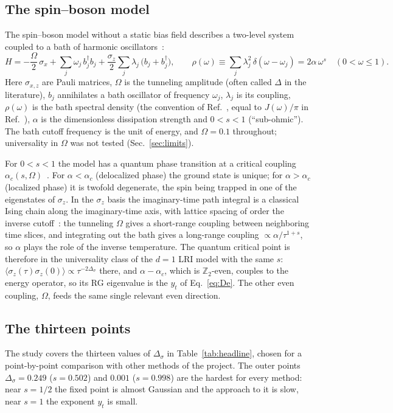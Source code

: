 \documentclass[10pt,a4paper]{article}
\newcommand{\Ds}{\Delta_\sigma}
\begin{document}
\subsection{The spin--boson model}
The spin--boson model without a static bias field describes a two-level system coupled to a bath of harmonic
oscillators~\cite{Leggett1987}:
\begin{equation}
H=-\frac{\Omega}{2}\,\sigma_x+\sum_j\omega_j\,b_j^\dagger b_j+\frac{\sigma_z}{2}\sum_j\lambda_j\,\big(b_j+b_j^\dagger\big),\qquad
\rho(\omega)\equiv\sum_j\lambda_j^2\,\delta(\omega-\omega_j)=2\alpha\,\omega^{s}\quad(0<\omega\le1).
\label{eq:H}
\end{equation}
Here $\sigma_{x,z}$ are Pauli matrices, $\Omega$ is the tunneling amplitude (often called $\Delta$ in the literature), $b_j$
annihilates a bath oscillator of frequency
$\omega_j$, $\lambda_j$ is its coupling, $\rho(\omega)$ is the bath spectral density (the convention of Ref.~\cite{Bulla2003}, equal to
$J(\omega)/\pi$ in Ref.~\cite{Leggett1987}), $\alpha$ is the dimensionless dissipation strength and $0<s<1$ (``sub-ohmic''). The bath
cutoff frequency is the unit of energy, and $\Omega=0.1$ throughout; universality in $\Omega$ was not tested (Sec.~\ref{sec:limits}).

For $0<s<1$ the model has a quantum phase transition at a critical coupling $\alpha_c(s,\Omega)$~\cite{Bulla2003,Vojta2006}. For
$\alpha<\alpha_c$ (delocalized phase) the ground state is unique; for $\alpha>\alpha_c$ (localized phase) it is twofold degenerate,
the spin being trapped in one of the eigenstates of $\sigma_z$. In the $\sigma_z$ basis the imaginary-time path integral is a classical
Ising chain along the imaginary-time axis, with lattice spacing of order the inverse cutoff~\cite{Leggett1987,Vojta2006}: the
tunneling $\Omega$ gives a short-range coupling between neighboring time slices, and integrating out the bath gives a long-range
coupling $\propto\alpha/\tau^{1+s}$, so $\alpha$ plays the role of the inverse temperature. The quantum critical point is therefore in
the universality class of the $d=1$ LRI model with the same $s$: $\langle\sigma_z(\tau)\sigma_z(0)\rangle\propto\tau^{-2\Ds}$ there,
and $\alpha-\alpha_c$, which is $\mathbb Z_2$-even, couples to the energy operator, so its RG eigenvalue is the $y_t$ of
Eq.~\eqref{eq:De}. The other even coupling, $\Omega$, feeds the same single relevant even direction.

\subsection{The thirteen points}
The study covers the thirteen values of $\Ds$ in Table~\ref{tab:headline}, chosen for a point-by-point comparison with other methods
of the project. The outer points $\Ds=0.249$ ($s=0.502$) and $0.001$ ($s=0.998$) are the hardest for every method: near $s=1/2$ the
fixed point is almost Gaussian and the approach to it is slow, near $s=1$ the exponent $y_t$ is small.
\end{document}

